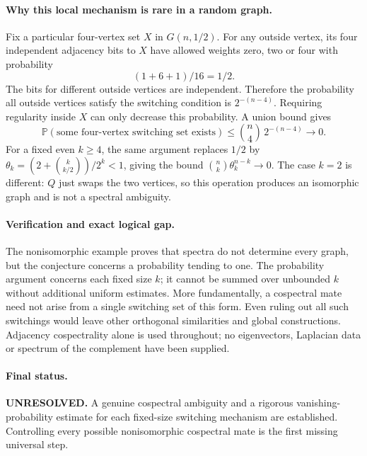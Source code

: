 \documentclass[11pt,a4paper]{article}
\begin{document}
\paragraph{Why this local mechanism is rare in a random graph.}
Fix a particular four-vertex set $X$ in $G(n,1/2)$. For any outside
vertex, its four independent adjacency bits to $X$ have allowed
weights zero, two or four with probability
\[
 (1+6+1)/16=1/2.
\]
The bits for different outside vertices are independent. Therefore
the probability all outside vertices satisfy the switching condition
is $2^{-(n-4)}$. Requiring regularity inside $X$ can only decrease
this probability. A union bound gives
\[
 \mathbb P(\text{some four-vertex switching set exists})
 \le\binom n4\,2^{-(n-4)}\longrightarrow0.
\]
For a fixed even $k\ge4$, the same argument replaces $1/2$ by
$\theta_k=(2+\binom k{k/2})/2^k<1$, giving the bound
$\binom nk\theta_k^{n-k}\to0$. The case $k=2$ is different:
$Q$ just swaps the two vertices, so this operation produces an
isomorphic graph and is not a spectral ambiguity.

\paragraph{Verification and exact logical gap.}
The nonisomorphic example proves that spectra do not determine every
graph, but the conjecture concerns a probability tending to one.
The probability argument concerns each fixed size $k$; it cannot
be summed over unbounded $k$ without additional uniform estimates.
More fundamentally, a cospectral mate need not arise from a single
switching set of this form. Even ruling out all such switchings
would leave other orthogonal similarities and global constructions.
Adjacency cospectrality alone is used throughout; no eigenvectors,
Laplacian data or spectrum of the complement have been supplied.

\paragraph{Final status.}
\textbf{UNRESOLVED.} A genuine cospectral ambiguity and a rigorous
vanishing-probability estimate for each fixed-size switching mechanism
are established. Controlling every possible nonisomorphic cospectral
mate is the first missing universal step.
\end{document}
